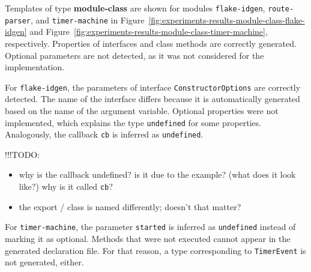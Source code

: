 \documentclass[a4paper,english,cleveref, autoref]{lipics-v2019}
\newcommand{\figref}[1]{Figure~\ref{#1}}
\begin{document}
Templates of type \textbf{module-class} are shown for modules
\texttt{flake-idgen}, \texttt{route-parser}, and \texttt{timer-machine}
in \figref{fig:experiments-results-module-class-flake-idgen} and
\figref{fig:experiments-results-module-class-timer-machine},
respectively. Properties of interfaces and class methods are correctly
generated. Optional parameters are not detected, as it was not
considered for the implementation.

For \texttt{flake-idgen},  the parameters of interface
\texttt{ConstructorOptions} are correctly detected. The name of the
interface differs because it is automatically generated based on the
name of the argument variable. Optional properties were not
implemented, which explains the type \lstinline{undefined} for some
properties. Analogously, the callback \texttt{cb} is inferred as
\lstinline{undefined}.

!!!TODO:
\begin{itemize}
\item why is the callback undefined? is it due to the example? (what does it
  look like?) why is it called \texttt{cb}?
\item the export / class is named differently; doesn't that matter?
\end{itemize}

For \texttt{timer-machine},  the parameter \lstinline{started} is
inferred as \lstinline{undefined} instead of marking it as
optional. Methods that were not executed cannot appear in the
generated declaration file. For that reason, a type corresponding to
\lstinline{TimerEvent} is not generated, either.
\end{document}
